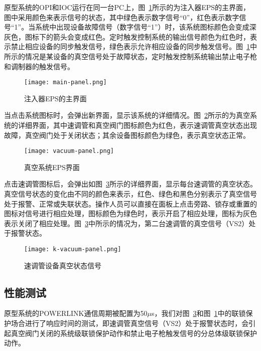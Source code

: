 原型系统的OPI和IOC运行在同一台PC上，图~\ref{fig:main-panel}所示的为注入器EPS的主界面，图中采用颜色来表示信号的状态，其中绿色表示数字信号“0”，红色表示数字信号“1”。当系统中出现设备故障信号（数字信号“1”）时，该系统图标颜色会变成深灰色，图标下的箭头会变成红色。定时触发控制系统的输出信号颜色为红色时，表示禁止相应设备的同步触发信号，绿色表示允许相应设备的同步触发信号。图~\ref{fig:main-panel}中所示的情况是某设备的真空信号处于故障状态，定时触发控制系统输出禁止电子枪和调制器的触发信号。

\begin{figure}[!htb]
	\centering
	\texttt{[image: main-panel.png]}
	\caption{注入器EPS的主界面}
	\label{fig:main-panel}
\end{figure}

当点击系统图标时，会弹出新界面，显示该系统的详细情况。图~\ref{fig:vacuum-panel}所示的为真空系统的详细界面，其中速调管和真空阀门图标颜色为红色，表示速调管真空状态出现故障，真空阀门处于关闭状态；其余设备图标颜色为绿色，表示真空状态正常。

\begin{figure}[!htb]
	\centering
	\texttt{[image: vacuum-panel.png]}
	\caption{真空系统EPS界面}
	\label{fig:vacuum-panel}
\end{figure}

点击速调管图标后，会弹出如图~\ref{fig:k-vacuum-panel}所示的详细界面，显示每台速调管的真空状态。真空信号状态的变化由不同的颜色来表示，红色、绿色和黑色分别表示了真空信号处于报警、正常或失联状态。操作人员可以直接在面板上点击旁路、锁存或重置的图标对信号进行相应处理，图标颜色为绿色时，表示开启了相应处理，图标为灰色表示关闭了相应处理。图~\ref{fig:k-vacuum-panel}中所示的情况为，第二台速调管的真空信号（VS2）处于报警状态。

\begin{figure}[!htb]
	\centering
	\texttt{[image: k-vacuum-panel.png]}
	\caption{速调管设备真空状态信号}
	\label{fig:k-vacuum-panel}
\end{figure}


\subsection{性能测试}

原型系统的POWERLINK通信周期被配置为50$\mu$s，我们对图~\ref{fig:k-vacuum-panel}和图~\ref{fig:main-panel}中的联锁保护场合进行了响应时间的测试，即速调管真空信号（VS2）处于报警状态时，会引起真空阀门关闭的系统级联锁保护动作和禁止电子枪触发信号的分总体级联锁保护动作。

